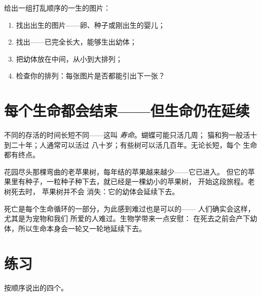 \begin{method}[将生命阶段排序]\label{met:g2:born-grow-die:order}
给出一组打乱顺序的一生的图片：
\begin{enumerate}
  \item 找出出生的图片——卵、种子或刚出生的婴儿；
  \item 找出——已完全长大，能够生出幼体；
  \item 把幼体放在中间，从小到大排列；
  \item 检查你的排列：每张图片是否都能引出下一张？
\end{enumerate}
\end{method}

\section{每个生命都会结束——但生命仍在延续}

\begin{proposition}[寿命]\label{prop:g2:born-grow-die:lifespan}
不同的存活的时间长短不同——这叫
\emph{寿命}。蝴蝶可能只活几周；
猫和狗一般活十到二十年；人通常可以活过
八十岁；有些树可以活几百年。无论长短，每个
生命都有终点。
\end{proposition}
\admitted

\begin{example}[老苹果树]\label{ex:g2:born-grow-die:oldtree}
花园尽头那棵弯曲的老苹果树，每年结的苹果越来越少——它已进入。
但它的苹果里有种子，一粒种子种下去，就已经是一棵幼小的苹果树，
开始这段旅程。老树死去时，
苹果树并不会
消失：它的幼体会延续下去。
\end{example}

\begin{remark}[谈论死亡]\label{rem:g2:born-grow-die:death}
死亡是每个生命循环的一部分，为此感到难过也是可以的——
人们确实会这样，尤其是为宠物和我们
所爱的人难过。生物学带来一点安慰：
在死去之前会产下幼体，所以生命本身会一轮又一轮地延续下去。
\end{remark}

\section{练习}

\begin{exercise}[$\star$]\label{exo:g2:born-grow-die:1}
按顺序说出的四个。
\end{exercise}

